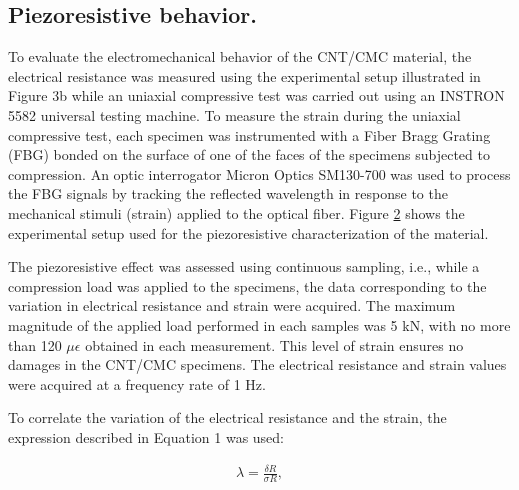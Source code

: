 \documentclass[twocolumn]{bmcart}%
\begin{document}
\begin{figure}[h!]
  \caption{
      }
  \label{fig3}
      \end{figure}


\subsection{Piezoresistive behavior.}

To evaluate the electromechanical behavior of the CNT/CMC material, the electrical resistance was measured using the experimental setup illustrated in Figure 3b while an uniaxial compressive test was carried out using an INSTRON 5582 universal testing machine. To measure the strain during the uniaxial compressive test, each specimen was instrumented with a Fiber Bragg Grating (FBG) bonded on the surface of one of the faces of the specimens subjected to compression. An optic interrogator Micron Optics SM130-700 was used to process the FBG signals by tracking the reflected wavelength in response to the mechanical stimuli (strain) applied to the optical fiber. Figure \ref{fig4} shows the experimental setup used for the piezoresistive characterization of the material. 


The piezoresistive effect was assessed using continuous sampling, i.e., while a compression load was applied to the specimens, the data corresponding to the variation in electrical resistance and strain were acquired. The maximum magnitude of the applied load performed in each samples was 5 kN, with no more than 120 $\mu\epsilon$ obtained in each measurement. This level of strain ensures no damages in the CNT/CMC specimens. The electrical resistance and strain values were acquired at a frequency rate of 1 Hz.

\begin{figure}[h!]
  \caption{
      }
    \label{fig4}
      \end{figure}

To correlate the variation of the electrical resistance and the strain, the expression described in Equation 1 was used:

\begin{eqnarray}\label{eqexpmuts}
\lambda = \frac{\delta R}{\sigma R},
\label{eq1}
\end{eqnarray}
\end{document}

